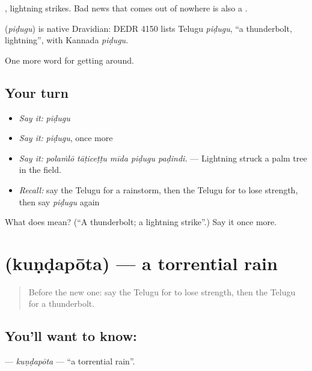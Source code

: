  , lightning strikes. Bad news that comes out of nowhere is also a .

\begin{cousinweb}
\textbf{} (\emph{piḍugu}) is native Dravidian: DEDR 4150 lists Telugu \emph{piḍugu}, \textquotedblleft{}a thunderbolt, lightning\textquotedblright{}, with Kannada \emph{piḍugu}.
\end{cousinweb}

\begin{grammarlens}[title={What you've built}]
One more word for getting around.
\end{grammarlens}

\subsection*{Your turn}
\begin{itemize}
\raggedright
  \item \emph{Say it:} \emph{piḍugu}
  \item \emph{Say it:} \emph{piḍugu}, once more
  \item \emph{Say it:} \emph{polaṁlō tāṭiceṭṭu mīda piḍugu paḍindi.} — Lightning struck a palm tree in the field.
  \item \emph{Recall:} say the Telugu for a rainstorm, then the Telugu for to lose strength, then say \emph{piḍugu} again
\end{itemize}

\begin{tcolorbox}[breakable,colback=teal!4,colframe=teal!35!black,title={Before you move on}]
What does  mean? (\textquotedblleft{}A thunderbolt; a lightning strike\textquotedblright{}.) Say it once more.
\end{tcolorbox}
\section[\texorpdfstring{\te{కుండపోత} (kuṇḍapōta)}{కుండపోత (kuṇḍapōta)}]{ (kuṇḍapōta) — a torrential rain}

\label{lesson:TE-C479-kundapota}



\begin{quote}
Before the new one: say the Telugu for to lose strength, then the Telugu for a thunderbolt.
\end{quote}

\subsection*{You'll want to know: }
\textbf{} — \emph{kuṇḍapōta} — \textquotedblleft{}a torrential rain\textquotedblright{}.

